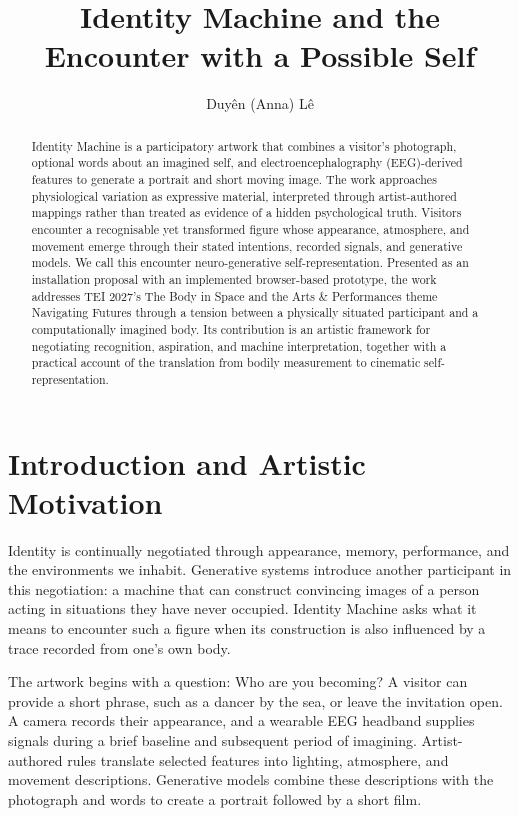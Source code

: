 \documentclass[manuscript,screen,nonacm]{acmart}
\title{Identity Machine and the Encounter with a Possible Self}
\author{Duy\^en (Anna) L\^e}
\affiliation{\institution{School of Art, Texas Tech University}\city{Lubbock}\state{Texas}\country{USA}}
\begin{document}
\begin{abstract}
Identity Machine is a participatory artwork that combines a visitor's photograph, optional words about an imagined self, and electroencephalography (EEG)-derived features to generate a portrait and short moving image. The work approaches physiological variation as expressive material, interpreted through artist-authored mappings rather than treated as evidence of a hidden psychological truth. Visitors encounter a recognisable yet transformed figure whose appearance, atmosphere, and movement emerge through their stated intentions, recorded signals, and generative models. We call this encounter neuro-generative self-representation. Presented as an installation proposal with an implemented browser-based prototype, the work addresses TEI 2027's The Body in Space and the Arts \& Performances theme Navigating Futures through a tension between a physically situated participant and a computationally imagined body. Its contribution is an artistic framework for negotiating recognition, aspiration, and machine interpretation, together with a practical account of the translation from bodily measurement to cinematic self-representation.
\end{abstract}
\maketitle
\section{Introduction and Artistic Motivation}
Identity is continually negotiated through appearance, memory, performance, and the environments we inhabit. Generative systems introduce another participant in this negotiation: a machine that can construct convincing images of a person acting in situations they have never occupied. Identity Machine asks what it means to encounter such a figure when its construction is also influenced by a trace recorded from one's own body.

The artwork begins with a question: Who are you becoming? A visitor can provide a short phrase, such as a dancer by the sea, or leave the invitation open. A camera records their appearance, and a wearable EEG headband supplies signals during a brief baseline and subsequent period of imagining. Artist-authored rules translate selected features into lighting, atmosphere, and movement descriptions. Generative models combine these descriptions with the photograph and words to create a portrait followed by a short film.
\end{document}
